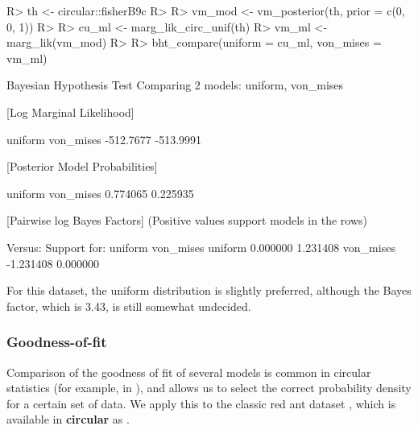 \documentclass{article}
\newcommand{\code}[1]{\texttt{\detokenize{#1}}}
\newcommand{\pkg}[1]{\textbf{#1}}
\newenvironment{CodeChunk}{}{}
\begin{document}
\begin{CodeChunk}
	
	\begin{CodeInput}
		R> th <- circular::fisherB9c
		R> 
		R> vm_mod <- vm_posterior(th, prior = c(0, 0, 1))
		R> 
		R> cu_ml  <- marg_lik_circ_unif(th)
		R> vm_ml  <- marg_lik(vm_mod)
		R> 
		R> bht_compare(uniform = cu_ml, von_mises = vm_ml)
	\end{CodeInput}
	
	\begin{CodeOutput}
		Bayesian Hypothesis Test
		Comparing 2 models: uniform, von_mises
		
		[Log Marginal Likelihood]
		
		uniform von_mises 
		-512.7677 -513.9991 
		
		
		[Posterior Model Probabilities]
		
		uniform von_mises 
		0.774065  0.225935 
		
		
		[Pairwise log Bayes Factors]
		(Positive values support models in the rows)
		
		Versus: 
		Support for:      uniform von_mises
		uniform    0.000000  1.231408
		von_mises -1.231408  0.000000
	\end{CodeOutput}
\end{CodeChunk}

For this dataset, the uniform distribution is slightly preferred,
although the Bayes factor, which is 3.43, is still somewhat undecided.

\hypertarget{goodness-of-fit}{%
	\subsubsection{Goodness-of-fit}\label{goodness-of-fit}}

Comparison of the goodness of fit of several models is common in
circular statistics (for example, in \citet{pewsey2013circular}), and
allows us to select the correct probability density for a certain set of
data. We apply this to the classic red ant dataset
\citep{jander1957optische, fisher1995statistical}, which is available in
\pkg{circular} as \code{circular::fisherB7c}.
\end{document}
